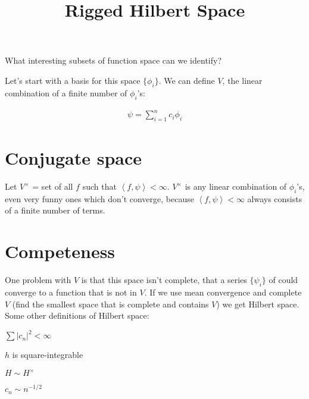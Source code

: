 \documentclass{article}
\title{Rigged Hilbert Space}
\date{}
\begin{document}
\maketitle

What interesting subsets of function space can we identify?

Let's start with a basis for this space $\{\phi_i\}$. We can define $V$, the linear combination of a finite number of $\phi_i$'s:

\begin{align}
\psi = \sum_{i=1}^n c_i \phi_i
\end{align}

\section{Conjugate space}

Let $V^\times$ = set of all $f$ such that $\left< f,\psi \right> < \infty$. $V^\times$ is any linear combination of $\phi_i$'s, even very funny ones which don't converge, because $\left< f,\psi \right> < \infty$ always consists of a finite number of terms.

\section{Competeness}

One problem with $V$ is that this space isn't complete, that a series $\{\psi_i\}$ of could converge to a function that is not in $V$. If we use mean convergence and complete $V$ (find the smallest space that is complete and contains $V$) we get Hilbert space. Some other definitions of Hilbert space:

$\sum |c_n|^2 < \infty$

$h$ is square-integrable

$H \sim H^\times$

$c_n \sim n^{-1/2}$
\end{document}
